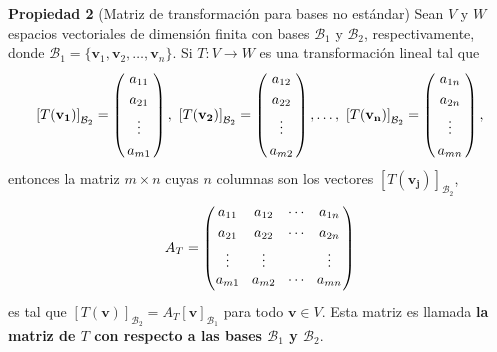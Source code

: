 {\nologo
\begin{frame}%

\vspace{-2mm}
\begin{prop}{\textbf{Propiedad 2} (Matriz de transformación para bases no estándar)}
	\justifying
	Sean $V$ y $W$ espacios vectoriales de dimensión finita con bases $\mathcal{B}_1$ y $\mathcal{B}_2$, respectivamente, donde $\mathcal{B}_1=\{\mathbf{v}_1, \mathbf{v}_2,\dots, \mathbf{v}_n \}$. Si $T:V\longrightarrow W$ es una transformación lineal tal que
	 \[
	\left[T(\mathbf{v_1})\right]_{\mathcal{B}_2}=
	\left(
	\begin{array}{@{\hspace{0.3\tabcolsep}}c@{\hspace{0.3\tabcolsep}}}
	a_{11}  \\[1mm]
	a_{21}  \\[1mm]
	\vdots \\[1mm]
	a_{m1}
	\end{array}
	\right)
	,  \ \left[T(\mathbf{v_2})\right]_{\mathcal{B}_2}=
	\left(
	\begin{array}{@{\hspace{0.3\tabcolsep}}c@{\hspace{0.3\tabcolsep}}}
	a_{12}  \\[1mm]
	a_{22}  \\[1mm]
	\vdots \\[1mm]
	a_{m2}
	\end{array}
	\right), \dots, 
	\ \left[T(\mathbf{v_n})\right]_{\mathcal{B}_2}=
	\left(
	\begin{array}{@{\hspace{0.3\tabcolsep}}c@{\hspace{0.3\tabcolsep}}}
	a_{1n}  \\[1mm]
	a_{2n}  \\[1mm]
	\vdots \\[1mm]
	a_{mn}
	\end{array}
	\right),
	\]
	entonces la matriz $m\times n$ cuyas $n$ columnas son los vectores $\left[T(\mathbf{v_j})\right]_{\mathcal{B}_2}$,
	\[
	A_T=\left(
	\begin{array}{@{\hspace{0.1\tabcolsep}}c@{\hspace{1.5\tabcolsep}}c@{\hspace{1.5\tabcolsep}}c@{\hspace{1.5\tabcolsep}}c@{\hspace{0.1\tabcolsep}}}
	a_{11} & a_{12} & \cdots & a_{1n} \\[1mm]
	a_{21} & a_{22} & \cdots & a_{2n} \\[1mm]
	\vdots & \vdots &        & \vdots \\[0mm]
	a_{m1} & a_{m2} & \cdots & a_{mn} \\[1mm]
	\end{array}
	\right)
	\]
	es tal que $\left[T(\mathbf{v})\right]_{\mathcal{B}_2}=A_T\left[\mathbf{v}\right]_{\mathcal{B}_1}$ para todo $\mathbf{v}\in V$. Esta matriz es llamada \textbf{la matriz de $T$ con respecto a las bases $\mathcal{B}_1$ y $\mathcal{B}_2$}.
\end{prop}	


\end{frame}}
